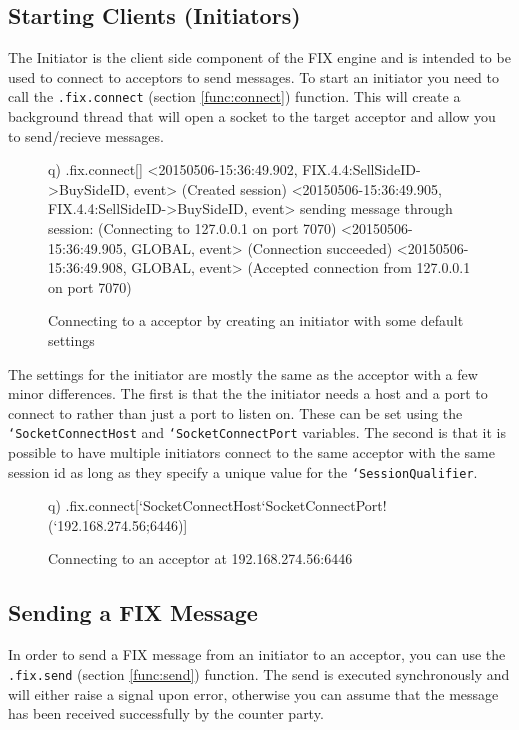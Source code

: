 \subsection{Starting Clients (Initiators)}

The Initiator is the client side component of the FIX engine and is intended to be used to connect to acceptors to send messages. To start an initiator you need to call the \texttt{.fix.connect} (section \ref{func:connect}) function. This will create a background thread that will open a socket to the target acceptor and allow you to send/recieve messages.

\begin{figure}[H]
\begin{qcode}
q) .fix.connect[]
<20150506-15:36:49.902, FIX.4.4:SellSideID->BuySideID, event>
(Created session)
<20150506-15:36:49.905, FIX.4.4:SellSideID->BuySideID, event>
sending message through session:   (Connecting to 127.0.0.1 on port 7070)
<20150506-15:36:49.905, GLOBAL, event>
(Connection succeeded)
<20150506-15:36:49.908, GLOBAL, event>
(Accepted connection from 127.0.0.1 on port 7070)
\end{qcode}
\caption{Connecting to a acceptor by creating an initiator with some default settings}
\end{figure}

The settings for the initiator are mostly the same as the acceptor with a few minor differences. The first is that the the initiator needs a host and a port to connect to rather than just a port to listen on. These can be set using the \texttt{`SocketConnectHost} and \texttt{`SocketConnectPort} variables. The second is that it is possible to have multiple initiators connect to the same acceptor with the same session id as long as they specify a unique
value for the \texttt{`SessionQualifier}.

\begin{figure}[H]
\begin{qcode}
q) .fix.connect[`SocketConnectHost`SocketConnectPort!(`192.168.274.56;6446)]
\end{qcode}
\caption{Connecting to an acceptor at 192.168.274.56:6446}
\end{figure}

\subsection{Sending a FIX Message}
In order to send a FIX message from an initiator to an acceptor, you can use the \texttt{.fix.send} (section \ref{func:send}) function. The send is executed
synchronously and will either raise a signal upon error, otherwise you can assume that
the message has been received successfully by the counter party. 

